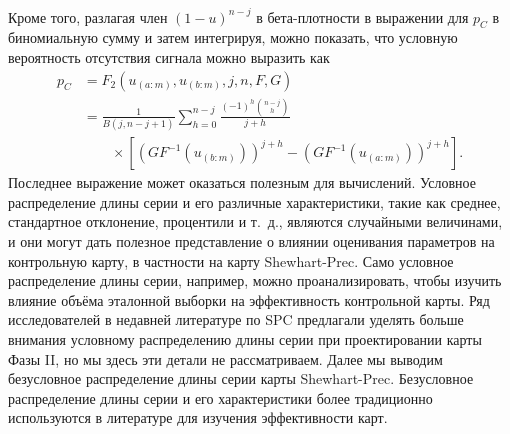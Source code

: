 Кроме того, разлагая член \((1 - u)^{n-j}\) в бета-плотности в выражении для \(p_C\) в биномиальную сумму и затем интегрируя, можно показать, что условную вероятность отсутствия сигнала можно выразить как
\begin{equation}
\begin{aligned}
	p_C &= F_2\left( u_{(a:m)}, u_{(b:m)}, j, n, F, G \right) \\
	    &= \frac{1}{B(j, n - j + 1)}\sum_{h=0}^{n-j} \frac{(-1)^h \binom{n - j}{h}}{j + h} \\
	    &\qquad \times \left[ \left(GF^{-1}\left(u_{(b:m)}\right)\right)^{j+h} - \left(GF^{-1}\left(u_{(a:m)}\right)\right)^{j+h} \right].
\end{aligned}
\label{eq:4.34}
\end{equation}
Последнее выражение может оказаться полезным для вычислений. Условное распределение длины серии и его различные характеристики, такие как среднее, стандартное отклонение, процентили и т.~д., являются случайными величинами, и они могут дать полезное представление о влиянии оценивания параметров на контрольную карту, в частности на карту Shewhart-Prec. Само условное распределение длины серии, например, можно проанализировать, чтобы изучить влияние объёма эталонной выборки на эффективность контрольной карты. Ряд исследователей в недавней литературе по SPC предлагали уделять больше внимания условному распределению длины серии при проектировании карты Фазы II, но мы здесь эти детали не рассматриваем. Далее мы выводим безусловное распределение длины серии карты Shewhart-Prec. Безусловное распределение длины серии и его характеристики более традиционно используются в литературе для изучения эффективности карт.

